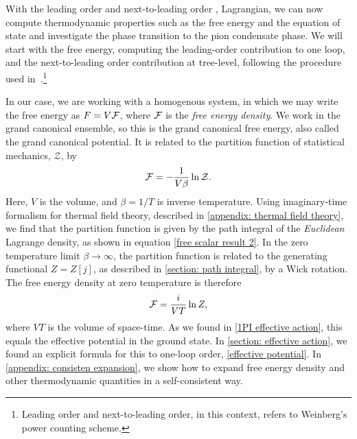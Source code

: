 
With the leading order and next-to-leading order \chpt, Lagrangian, we can now compute thermodynamic properties such as the free energy and the equation of state and investigate the phase transition to the pion condensate phase.
We will start with the free energy, computing the leading-order contribution to one loop, and the next-to-leading order contribution at tree-level, following the procedure used in~\autocite{adhikariTwoflavorChiralPerturbation2019,martinariaTwoflavorChiralPerturbation2020}.\footnote{Leading order and next-to-leading order, in this context, refers to Weinberg's power counting scheme.}

In our case, we are working with a homogenous system, in which we may write the free energy as $F = V\mathcal{F}$, where $\mathcal{F}$ is the \emph{free energy density}.
We work in the grand canonical ensemble, so this is the grand canonical free energy, also called the grand canonical potential.
It is related to the partition function of statistical mechanics, $\mathcal{Z}$, by
%
\begin{equation}
    \mathcal{F} = - \frac{1}{V \beta} \ln \mathcal{Z}.
\end{equation}
%
Here, $V$ is the volume, and $\beta = 1/T$ is inverse temperature.
Using imaginary-time formalism for thermal field theory, described in \autoref{appendix: thermal field theory}, we find that the partition function is given by the path integral of the \emph{Euclidean} Lagrange density, as shown in equation \autoref{free scalar result 2}.
In the zero temperature limit  $\beta \rightarrow \infty$, the partition function is related to the generating functional $Z = Z[j]$, as described in \autoref{section: path integral}, by a Wick rotation.
The free energy density at zero temperature is therefore
%
\begin{equation}
    \mathcal{F} = \frac{i}{VT} \ln Z,
\end{equation}
%
where $VT$ is the volume of space-time.
As we found in \autoref{1PI effective action}, this equals the effective potential in the ground state.
In \autoref{section: effective action}, we found an explicit formula for this to one-loop order, \autoref{effective potential}.
In \autoref{appendix: consisten expansion}, we show how to expand free energy density and other thermodynamic quantities in a self-consistent way.

